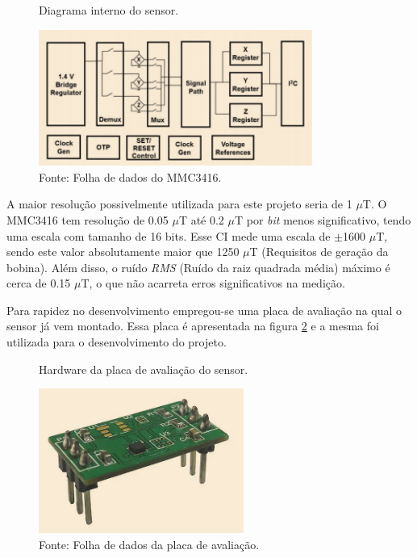 \begin{figure}[H]
    \centering
     \caption{Diagrama interno do sensor.}
     \includegraphics[width=0.8\textwidth]{./img/imagensExplicacoes/sensorDiag.png}
     \caption*{Fonte: Folha de dados do MMC3416.}
     \label{fig:sensDiag}
\end{figure}

A maior resolução possivelmente utilizada para este projeto seria de 1 $\mu$T. O MMC3416 tem resolução de 0.05 $\mu$T até 0.2 $\mu$T por \textit{bit} menos significativo, tendo uma escala com tamanho de 16 bits. Esse CI mede uma escala de $\pm$1600 $\mu$T, sendo este valor absolutamente maior que 1250 $\mu$T (Requisitos de geração da bobina). Além disso, o ruído \textit{RMS} (Ruído da raiz quadrada média) máximo é cerca de 0.15 $\mu$T, o que não acarreta erros significativos na medição.

Para rapidez no desenvolvimento empregou-se uma placa de avaliação na qual o sensor já vem montado. Essa placa é apresentada na figura \ref{fig:sensEval} e a mesma foi utilizada para o desenvolvimento do projeto.

\begin{figure}[H]
    \centering
     \caption{Hardware da placa de avaliação do sensor.}
     \includegraphics[width=0.6\textwidth]{./img/imagensExplicacoes/sensorEval.png}
     \caption*{Fonte: Folha de dados da placa de avaliação.}
     \label{fig:sensEval}
\end{figure}

